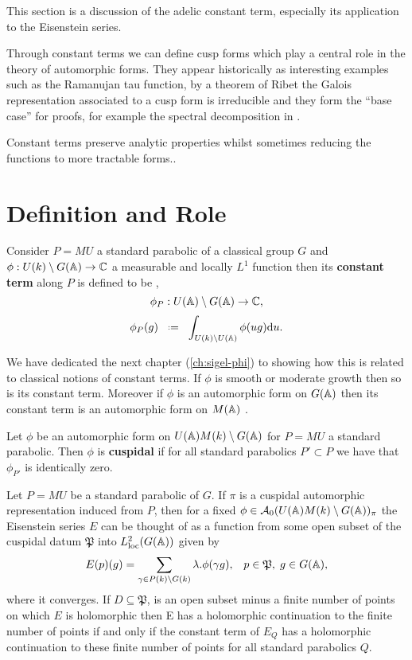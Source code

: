 This section is a discussion of the adelic constant term, especially its application to the Eisenstein series. 

Through constant terms we can define cusp forms which play a central role in the theory of automorphic forms. They appear historically as interesting examples such as the Ramanujan tau function, by a theorem of Ribet \cite[T2.3]{serreProceedingsInternationalConference1977} the Galois representation associated to a cusp form is irreducible and they form the ``base case'' for proofs, for example the spectral decomposition in \cite{moeglinSpectralDecompositionEisenstein1995}.

Constant terms preserve analytic properties whilst sometimes reducing the functions to more tractable forms..\label{constant_terms}


\section{Definition and Role} \label{cuspidal_form_definition}\label{sec:L-functions}
Consider \(P=MU\) a standard parabolic of a classical group \(G\) and \(\phi: U(k)\setminus G(\A) \to \C\) a measurable and locally \(L^1\) function then its \textbf{constant term} along \(P\) is defined to be \cite[I.2.6]{moeglinSpectralDecompositionEisenstein1995},
\[\phi_P :  U(\A)\setminus G(\A) \to \C,\]
\[\phi_P(g) \defeq \int_{U(k)\setminus U(\A)}\phi(ug) \mathrm{d}u.\]

We have dedicated the next chapter (\ref{ch:sigel-phi}) to showing how this is related to classical notions of constant terms. If \(\phi\) is smooth or moderate growth then so is its constant term. Moreover if \(\phi\) is an automorphic form on \(G(\A)\) then its constant term is an automorphic form on \(M(\A)\) \cite[6.5]{getzIntroductionAutomorphicRepresentations2024}.

Let \(\phi\) be an automorphic form on \(U(\A)M(k)\setminus G(\A)\) for \(P = MU\) a standard parabolic. Then \(\phi\) is \textbf{cuspidal} if for all standard parabolics \(P'\subset P\) we have that \(\phi_{P'}\) is identically zero. 

\begin{Theorem}
		Let \(P = MU\) be a standard parabolic of \(G\). If \(\pi\) is a cuspidal automorphic representation induced from \(P\), then for a fixed \(\phi \in\mathcal{A}_0(U(\A)M(k)\setminus G(\A))_\pi \) the Eisenstein series \(E\) can be thought of as a function from some open subset of the cuspidal datum \(\mathfrak{P}\) into \(L^2_{\mathrm{loc}}(G(\A))\) given by 
		\[E(p)(g) = \sum_{\gamma \in P(k)\backslash G(k)} \lambda.\phi(\gamma g), \;\;\; p\in \mathfrak{P},\; g\in G(\A),\]
		where it converges. 
		If \(D\subseteq \mathfrak{P}\), is an open subset minus a finite number of points on which \(E\) is holomorphic then E has a holomorphic continuation to the finite number of points if and only if the constant term of \(E_Q\) has a holomorphic continuation to these finite number of points for all standard parabolics \(Q\).
    \end{Theorem}
    
